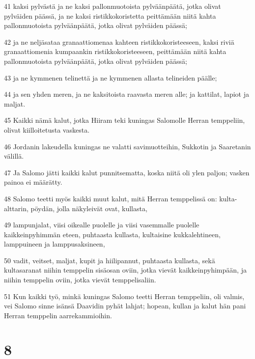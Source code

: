 \par 41 kaksi pylvästä ja ne kaksi pallonmuotoista pylväänpäätä, jotka olivat pylväiden päässä, ja ne kaksi ristikkokoristetta peittämään niitä kahta pallonmuotoista pylväänpäätä, jotka olivat pylväiden päässä;
\par 42 ja ne neljäsataa granaattiomenaa kahteen ristikkokoristeeseen, kaksi riviä granaattiomenia kumpaankin ristikkokoristeeseen, peittämään niitä kahta pallonmuotoista pylväänpäätä, jotka olivat pylväiden päässä;
\par 43 ja ne kymmenen telinettä ja ne kymmenen allasta telineiden päälle;
\par 44 ja sen yhden meren, ja ne kaksitoista raavasta meren alle; ja kattilat, lapiot ja maljat.
\par 45 Kaikki nämä kalut, jotka Hiiram teki kuningas Salomolle Herran temppeliin, olivat kiilloitetusta vaskesta.
\par 46 Jordanin lakeudella kuningas ne valatti savimuotteihin, Sukkotin ja Saaretanin välillä.
\par 47 Ja Salomo jätti kaikki kalut punnitsematta, koska niitä oli ylen paljon; vasken painoa ei määrätty.
\par 48 Salomo teetti myös kaikki muut kalut, mitä Herran temppelissä on: kulta-alttarin, pöydän, jolla näkyleivät ovat, kullasta,
\par 49 lampunjalat, viisi oikealle puolelle ja viisi vasemmalle puolelle kaikkeinpyhimmän eteen, puhtaasta kullasta, kultaisine kukkalehtineen, lamppuineen ja lamppusaksineen,
\par 50 vadit, veitset, maljat, kupit ja hiilipannut, puhtaasta kullasta, sekä kultasaranat niihin temppelin sisäosan oviin, jotka vievät kaikkeinpyhimpään, ja niihin temppelin oviin, jotka vievät temppelisaliin.
\par 51 Kun kaikki työ, minkä kuningas Salomo teetti Herran temppeliin, oli valmis, vei Salomo sinne isänsä Daavidin pyhät lahjat; hopean, kullan ja kalut hän pani Herran temppelin aarrekammioihin.

\chapter{8}

